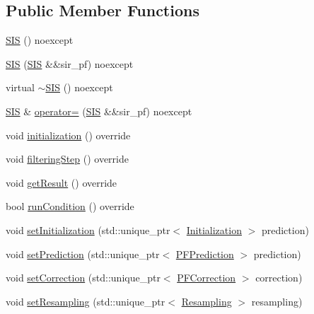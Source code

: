 \subsection*{Public Member Functions}
\begin{DoxyCompactItemize}
\item 
\mbox{\hyperlink{classbfl_1_1SIS_a65cd523b660bd8f41e112841aaf45c0d}{S\+IS}} () noexcept
\item 
\mbox{\hyperlink{classbfl_1_1SIS_af66e323d22b28f497152f2e3a65290ff}{S\+IS}} (\mbox{\hyperlink{classbfl_1_1SIS}{S\+IS}} \&\&sir\+\_\+pf) noexcept
\item 
virtual \mbox{\hyperlink{classbfl_1_1SIS_afe51d2eb915e0813ee4dc804a680566b}{$\sim$\+S\+IS}} () noexcept
\item 
\mbox{\hyperlink{classbfl_1_1SIS}{S\+IS}} \& \mbox{\hyperlink{classbfl_1_1SIS_a32458a24446df8126ace63f21de2bf02}{operator=}} (\mbox{\hyperlink{classbfl_1_1SIS}{S\+IS}} \&\&sir\+\_\+pf) noexcept
\item 
void \mbox{\hyperlink{classbfl_1_1SIS_aaf9f4a14d51804eddcd93aa8a5ccbba8}{initialization}} () override
\item 
void \mbox{\hyperlink{classbfl_1_1SIS_a582f06cc5456d2cc6ed8f90087cbbb4c}{filtering\+Step}} () override
\item 
void \mbox{\hyperlink{classbfl_1_1SIS_a059da4c932379643ff7005fe4d0fda89}{get\+Result}} () override
\item 
bool \mbox{\hyperlink{classbfl_1_1SIS_afb7cff1f7dae80e0e4ca84c925ca3ac3}{run\+Condition}} () override
\item 
void \mbox{\hyperlink{classbfl_1_1ParticleFilter_abfeb75fd575802f362039c26169eed8b}{set\+Initialization}} (std\+::unique\+\_\+ptr$<$ \mbox{\hyperlink{classbfl_1_1Initialization}{Initialization}} $>$ prediction)
\item 
void \mbox{\hyperlink{classbfl_1_1ParticleFilter_a213811368143c1f498c87be70cf02379}{set\+Prediction}} (std\+::unique\+\_\+ptr$<$ \mbox{\hyperlink{classbfl_1_1PFPrediction}{P\+F\+Prediction}} $>$ prediction)
\item 
void \mbox{\hyperlink{classbfl_1_1ParticleFilter_a3d2935addf4481325a3fe8b99fe4d07a}{set\+Correction}} (std\+::unique\+\_\+ptr$<$ \mbox{\hyperlink{classbfl_1_1PFCorrection}{P\+F\+Correction}} $>$ correction)
\item 
void \mbox{\hyperlink{classbfl_1_1ParticleFilter_ad1618ed06b6e6e143e309e2267b970ee}{set\+Resampling}} (std\+::unique\+\_\+ptr$<$ \mbox{\hyperlink{classbfl_1_1Resampling}{Resampling}} $>$ resampling)
\item 

\end{DoxyCompactItemize}
